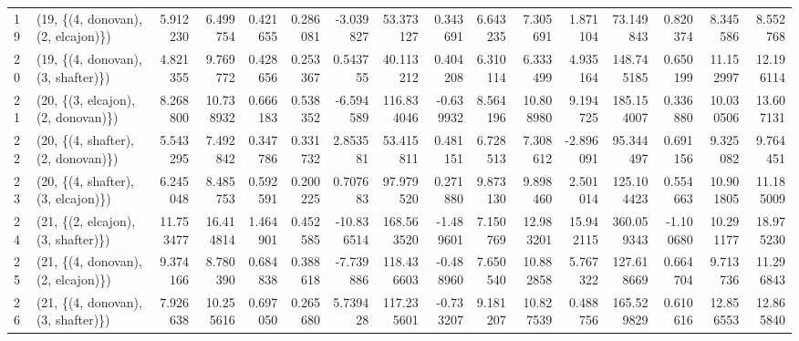 \begin{tabular}{llrrrrrrrrrrrrrr}
19 &  (19, \{(4, donovan), (2, elcajon)\}) &   5.912230 &   6.499754 &   0.421655 &  0.286081 &  -3.039827 &   53.373127 &  0.343691 &   6.643235 &   7.305691 &   1.871104 &   73.149843 &  0.820374 &   8.345586 &   8.552768 \\
20 &  (19, \{(4, donovan), (3, shafter)\}) &   4.821355 &   9.769772 &   0.428656 &  0.253367 &   0.543755 &   40.113212 &  0.404208 &   6.310114 &   6.333499 &   4.935164 &  148.745185 &  0.650199 &  11.152997 &  12.196114 \\
21 &  (20, \{(3, elcajon), (2, donovan)\}) &   8.268800 &  10.738932 &   0.666183 &  0.538352 &  -6.594589 &  116.834046 & -0.639932 &   8.564196 &  10.808980 &   9.194725 &  185.154007 &  0.336880 &  10.030506 &  13.607131 \\
22 &  (20, \{(4, shafter), (2, donovan)\}) &   5.543295 &   7.492842 &   0.347786 &  0.331732 &   2.853581 &   53.415811 &  0.481151 &   6.728513 &   7.308612 &  -2.896091 &   95.344497 &  0.691156 &   9.325082 &   9.764451 \\
23 &  (20, \{(4, shafter), (3, elcajon)\}) &   6.245048 &   8.485753 &   0.592591 &  0.200225 &   0.707683 &   97.979520 &  0.271880 &   9.873130 &   9.898460 &   2.501014 &  125.104423 &  0.554663 &  10.901805 &  11.185009 \\
24 &  (21, \{(2, elcajon), (3, shafter)\}) &  11.753477 &  16.414814 &   1.464901 &  0.452585 & -10.836514 &  168.563520 & -1.489601 &   7.150769 &  12.983201 &  15.942115 &  360.059343 & -1.100680 &  10.291177 &  18.975230 \\
25 &  (21, \{(4, donovan), (2, elcajon)\}) &   9.374166 &   8.780390 &   0.684838 &  0.388618 &  -7.739886 &  118.436603 & -0.488960 &   7.650540 &  10.882858 &   5.767322 &  127.618669 &  0.664704 &   9.713736 &  11.296843 \\
26 &  (21, \{(4, donovan), (3, shafter)\}) &   7.926638 &  10.255616 &   0.697050 &  0.265680 &   5.739428 &  117.235601 & -0.733207 &   9.181207 &  10.827539 &   0.488756 &  165.529829 &  0.610616 &  12.856553 &  12.865840 \\
\bottomrule
\end{tabular}
